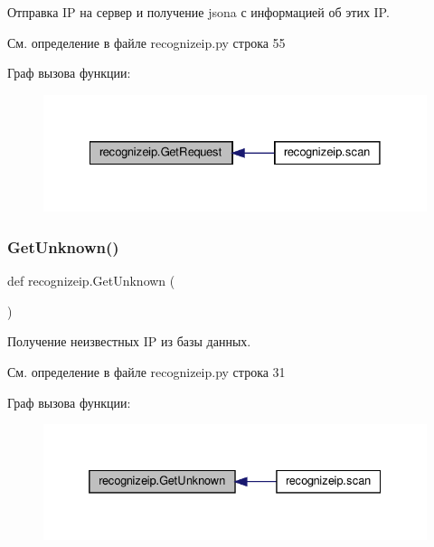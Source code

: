 Отправка IP на сервер и получение json\textquotesingle{}a с информацией об этих IP. 



См. определение в файле recognizeip.\+py строка 55

Граф вызова функции\+:\nopagebreak
\begin{figure}[H]
\begin{center}
\leavevmode
\includegraphics[width=328pt]{namespacerecognizeip_a362c41c14e0d237c722ab6c2234d6afa_icgraph}
\end{center}
\end{figure}
\mbox{\label{namespacerecognizeip_a3bb8e2d63860a9c4027908b34014c56b}} 
\subsubsection{\texorpdfstring{Get\+Unknown()}{GetUnknown()}}
{\footnotesize\ttfamily def recognizeip.\+Get\+Unknown (\begin{DoxyParamCaption}{ }\end{DoxyParamCaption})}



Получение неизвестных IP из базы данных. 



См. определение в файле recognizeip.\+py строка 31

Граф вызова функции\+:\nopagebreak
\begin{figure}[H]
\begin{center}
\leavevmode
\includegraphics[width=332pt]{namespacerecognizeip_a3bb8e2d63860a9c4027908b34014c56b_icgraph}
\end{center}
\end{figure}
\mbox{\label{namespacerecognizeip_a99d8f7a73addea7cea8ad5b0225e5005}} 
